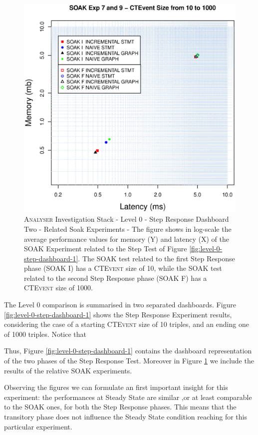\begin{figure}[htbp]
	\centering
	\includegraphics[width=0.90\linewidth]{images/level-0-step-dashboard-2}	
	\caption[\textsc{Analyser} Investigation Stack - Level 0 - Step Response Dashboard Two - Related Soak Experiments]{
\textsc{Analyser} Investigation Stack - Level 0 - Step Response Dashboard Two - Related Soak Experiments - The figure shows in log-scale the average performance values for memory (Y) and latency (X) of the SOAK Experiment related to the Step Test of Figure \ref{fig:level-0-step-dashboard-1}. The SOAK test related to the first Step Response phase (SOAK I) has a \textsc{CTEvent} size of 10, while the SOAK test related to the second Step Response phase (SOAK F) has a \textsc{CTEvent} size of 1000.}
	\label{fig:level-0-step-dashboard-2}
\end{figure}

The Level 0 comparison is summarised in two separated dashboards. Figure \ref{fig:level-0-step-dashboard-1} shows the Step Response Experiment results, considering the case of a starting \textsc{CTEvent} size of 10 triples, and an ending one of 1000 triples.
Notice that 


Thus, Figure \ref{fig:level-0-step-dashboard-1} contains the dashboard representation of the two phases of the Step Response Test. Moreover in Figure \ref{fig:level-0-step-dashboard-2} we include the results of the relative SOAK experiments. 

Observing the figures we can formulate an first important insight for this experiment: the performances at Steady State are similar ,or at least comparable to the SOAK ones, for both the Step Response phases. This means that the transitory phase does not influence the Steady State condition reaching for this particular experiment.

